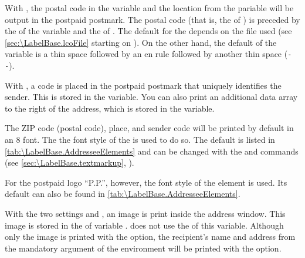 With
, the postal code in the 
variable and the location from the  pariable will be output in
the postpaid postmark. The postal code (that is, the  of
) is preceded by the  of the
 variable and the  of
. The default for the  depends
on the  file used (see \autoref{sec:\LabelBase.lcoFile} starting on
). On the other hand, the default
 of the  variable is a thin space
followed by an en rule followed by another thin space
(\Macro{,}\texttt{-{}-}\Macro{,}).

With
, a code is
placed in the postpaid postmark that uniquely identifies the sender. This is
stored in the  variable. You can also print an additional
data array to the right of the address, which is stored in the
 variable.

\BeginIndexGroup
{}
The ZIP code (postal code), place, and
sender code will be printed by default in an 8 font. The the font
style of the  is used to
do so. The default is listed in \autoref{tab:\LabelBase.AddresseeElements} and
can be changed with the  and
 commands (see
\autoref{sec:\LabelBase.textmarkup},
).%
\EndIndexGroup

\BeginIndexGroup
{} For the postpaid
logo ``P.P.'', however, the font style of the
 element is used. Its
default can also be found in \autoref{tab:\LabelBase.AddresseeElements}.%
\EndIndexGroup

With the two settings
and , an image is print inside the address
window. This image is stored in the  of variable
. \KOMAScript{} does not use the 
of this variable. Although only the image is printed with the
 option, the recipient's name and address from
the mandatory argument of the  environment will
be printed with the  option.

